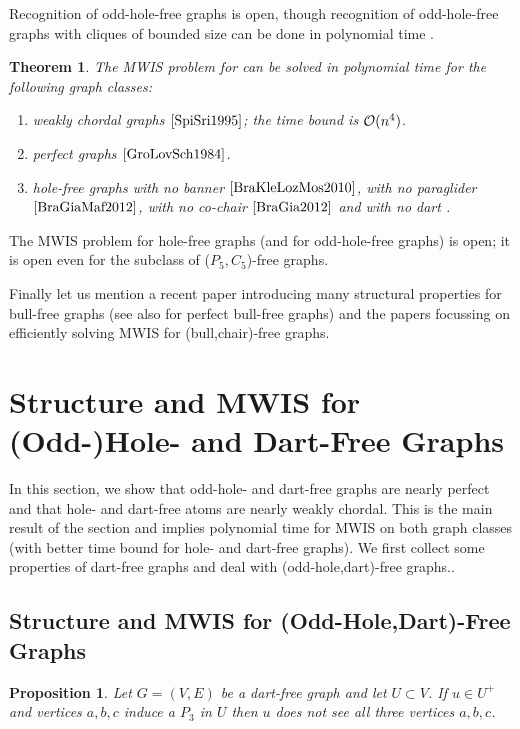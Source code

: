 \documentclass[11pt]{article}
\newcommand{\0}{\text{ has a co-join to }}
\newcommand{\1}{\text{ has a join to }}
\newtheorem{theo}{Theorem}
\newtheorem{prop}{Proposition}
\begin{document}
Recognition of odd-hole-free graphs is open, though recognition of odd-hole-free graphs with cliques of bounded size can be done in polynomial time \cite{ConCorLiuVusZam}.
 
\begin{theo}\label{basicMWISprop}
The MWIS problem for can be solved in polynomial time for the following graph classes:
\begin{enumerate}
\item[$(i)$] weakly chordal graphs $\cite{SpiSri1995}$; the time bound is ${\cal O}(n^4)$.
\item[$(ii)$] perfect graphs $\cite{GroLovSch1984}$.
\item[$(iii)$] hole-free graphs with no banner $\cite{BraKleLozMos2010}$, with no paraglider $\cite{BraGiaMaf2012}$, with no co-chair $\cite{BraGia2012}$ and with no dart \cite{BasChaKar2012}.
\end{enumerate}
\end{theo} 

The MWIS problem for hole-free graphs (and for odd-hole-free graphs) is open; it is open even for the subclass of ($P_5,C_5$)-free graphs. 

Finally let us mention a recent paper \cite{Chudn2011} introducing many structural properties for bull-free graphs (see also \cite{DeFMafPor1997} for perfect bull-free graphs) and the papers \cite{BraHoaLe2003,DeSSas1993} focussing on efficiently solving MWIS for (bull,chair)-free graphs. 

\section{Structure and MWIS for (Odd-)Hole- and Dart-Free Graphs}

In this section, we show that odd-hole- and dart-free graphs are nearly perfect and that hole- and dart-free atoms are nearly weakly chordal. This is the main result of the section and implies polynomial time for MWIS on both graph classes (with better time bound for hole- and dart-free graphs). We first collect some properties of dart-free graphs and deal with (odd-hole,dart)-free graphs.. 

\subsection{Structure and MWIS for (Odd-Hole,Dart)-Free Graphs}

\begin{prop}\label{prop:1}
Let $G = (V,E)$ be a dart-free graph and let $U \subset V$. If $u \in U^+$ and vertices $a,b,c$ induce a $P_3$ in $U$ then $u$ does not see all three vertices 
$a,b,c$. 
\end{prop}
\end{document}
